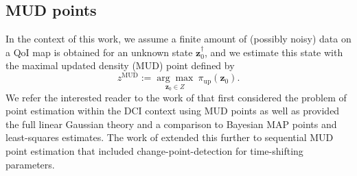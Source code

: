 \documentclass[final,1p,times]{elsarticle}
\begin{document}
\subsection{MUD points}\label{app:MUD}

In the context of this work, we assume a finite amount of (possibly noisy) data on a QoI map is obtained for an unknown state $\mathbf{z}_{0}^{\dagger}$, and we estimate this state with the maximal updated density (MUD) point defined by
\begin{equation}
 z^{\mathrm{MUD}}:= \underset{\mathbf{z}_{0}\in Z}{\arg\max} \ \pi_{\mathrm{up}}(\mathbf{z}_{0}).
\end{equation}
We refer the interested reader to the work of \cite{Pilosov2023} that first considered the problem of point estimation within the DCI context using MUD points as well as provided the full linear Gaussian theory and a comparison to Bayesian MAP points and least-squares estimates.
The work of \cite{del-Castillo-Negrete2024} extended this further to sequential MUD point estimation that included change-point-detection for time-shifting parameters. 
\end{document}
